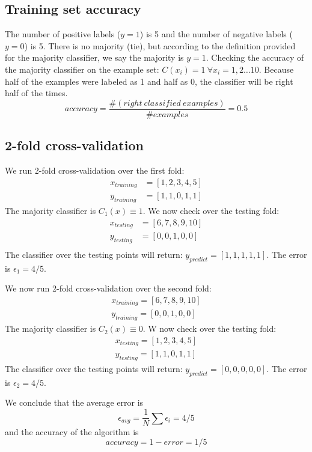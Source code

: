 \subsection{Training set accuracy}
The number of positive labels ($ y=1 $) is 5 and the number of negative labels ($ y=0 $) is 5. There is no majority (tie), but according to the definition provided for the majority classifier, we say the majority is $y=1$. Checking the accuracy of the majority classifier on the example set: $C(x_{i})=1\ \forall x_{i}=1,2\ldots10$. Because half of the examples were labeled as 1 and half as 0, the classifier will be right half of the times.
\begin{equation*}
    accuracy=\frac{\#(right\ classified\ examples)}{\#examples}=0.5
\end{equation*}

\subsection{2-fold cross-validation}
We run 2-fold cross-validation over the first fold:
\begin{align*}
    x_{training}&=[1,2,3,4,5] \\
    y_{training}&=[1,1,0,1,1]
\end{align*}
The majority classifier is $C_{1}(x)\equiv1$. We now check over the testing fold:
\begin{align*}
    x_{testing}&=[6,7,8,9,10] \\
    y_{testing}&=[0,0,1,0,0] \\
\end{align*}
The classifier over the testing points will return: $y_{predict}=[1,1,1,1,1]$. The error is $\epsilon_{1}=4/5$.

We now run 2-fold cross-validation over the second fold:
\begin{align*}
    x_{training}=[6,7,8,9,10] \\
    y_{training}=[0,0,1,0,0]
\end{align*}
The majority classifier is $C_{2}(x)\equiv0$. W now check over the testing fold:
\begin{align*}
    x_{testing}=[1,2,3,4,5] \\
    y_{testing}=[1,1,0,1,1]
\end{align*}
The classifier over the testing points will return: $y_{predict}=[0,0,0,0,0]$. The error is $\epsilon_{2}=4/5$.

We conclude that the average error is
\begin{equation*}
    \epsilon_{avg}=\frac{1}{N}\sum\epsilon_{i}=4/5
\end{equation*}
and the accuracy of the algorithm is
\begin{equation*}
    accuracy=1-error=1/5
\end{equation*}
